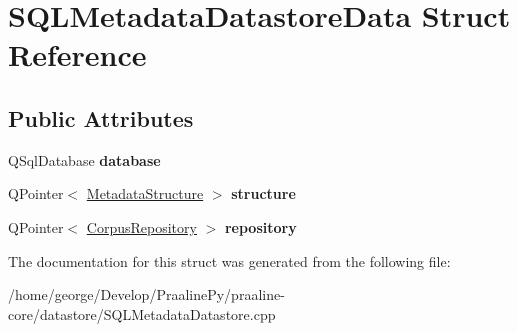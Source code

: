 \hypertarget{struct_s_q_l_metadata_datastore_data}{}\section{S\+Q\+L\+Metadata\+Datastore\+Data Struct Reference}
\label{struct_s_q_l_metadata_datastore_data}
\subsection*{Public Attributes}
\begin{DoxyCompactItemize}
\item 
\mbox{\label{struct_s_q_l_metadata_datastore_data_a9bb49466f8171179c4ea5d1ae3f8dfaf}} 
Q\+Sql\+Database {\bfseries database}
\item 
\mbox{\label{struct_s_q_l_metadata_datastore_data_a14deeb5958083f66042ef4da0374e2da}} 
Q\+Pointer$<$ \hyperlink{class_metadata_structure}{Metadata\+Structure} $>$ {\bfseries structure}
\item 
\mbox{\label{struct_s_q_l_metadata_datastore_data_a01138ce1dd2e931dc39698916743dfd3}} 
Q\+Pointer$<$ \hyperlink{class_corpus_repository}{Corpus\+Repository} $>$ {\bfseries repository}
\end{DoxyCompactItemize}


The documentation for this struct was generated from the following file\+:\begin{DoxyCompactItemize}
\item 
/home/george/\+Develop/\+Praaline\+Py/praaline-\/core/datastore/S\+Q\+L\+Metadata\+Datastore.\+cpp\end{DoxyCompactItemize}
